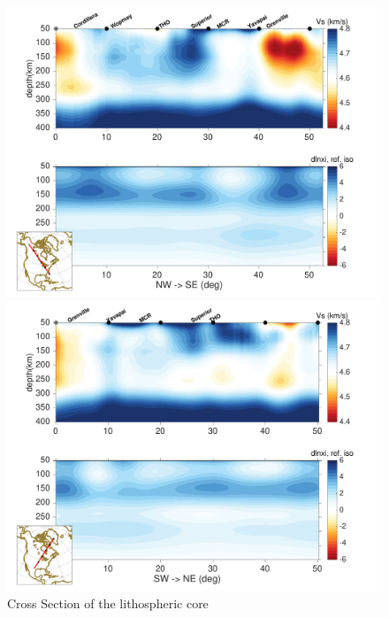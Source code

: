\documentclass[12pt]{article}
\begin{document}
	\begin{figure}
		\begin{minipage}{0.5\linewidth}
			\centerline{\includegraphics[width=\linewidth]{figures/profiles_NASEM3_vs_dxi_A.pdf}}
		\end{minipage}
		\hfill
		\begin{minipage}{0.5\linewidth}
			\centerline{\includegraphics[width=\linewidth]{figures/profiles_NASEM3_vs_dxi_B.pdf}}
		\end{minipage}

		\caption{Cross Section of the lithospheric core}
		\label{cratoncross}

	\end{figure}
\end{document}
